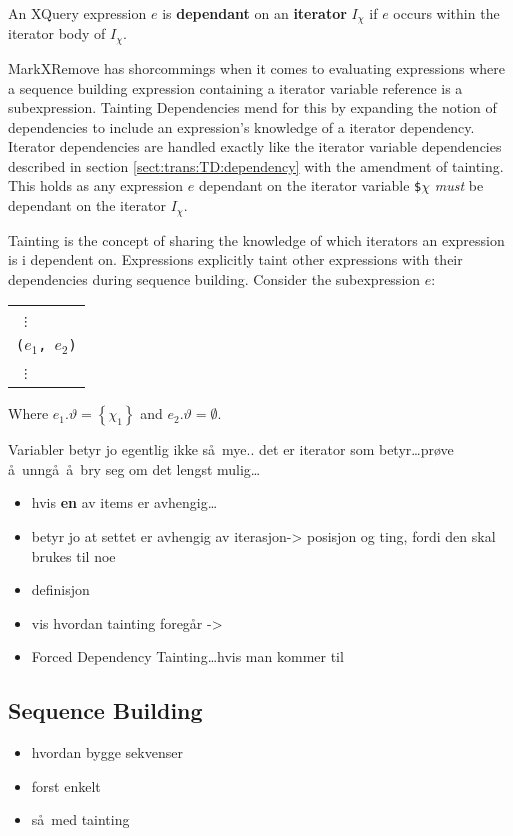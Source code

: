\noindent
\begin{myDefinition}
An XQuery expression $e$ is \textbf{dependant} on an \textbf{iterator} $I_{\chi}$ if $e$ occurs within the iterator
body of $I_{\chi}$.
\label{def:iteratorDep}
\end{myDefinition}

MarkXRemove has shorcommings when it comes to evaluating expressions where a sequence building expression
containing a iterator variable reference is a subexpression. Tainting Dependencies mend for this by expanding the
notion of dependencies to include an expression's knowledge of a iterator dependency. Iterator dependencies are
handled exactly like the iterator variable dependencies described in section \ref{sect:trans:TD:dependency} with
the amendment of tainting. This holds as any expression $e$ dependant on the iterator variable \texttt{\$}$\chi$
\textit{must} be dependant on the iterator $I_{\chi}$.

Tainting is the concept of sharing the knowledge of which iterators an expression is i dependent on. Expressions
explicitly taint other expressions with their dependencies during sequence building. Consider the subexpression
$e$:
\begin{center}
\begin{tabular}{l}
\quad \;\, $\vdots$  \\
\texttt{(}$e_{1}$\texttt{, }$e_{2}$\texttt{)}\\
\quad \;\, $\vdots$  
\end{tabular}
\end{center}
Where $e_{1}.\vartheta = \left\{\chi_{1}\right\}$ and $e_{2}.\vartheta = \emptyset$.


Variabler betyr jo egentlig ikke s\aa~mye.. det er iterator som betyr\ldots pr\o ve
\aa~unng\aa~\aa~bry seg om det lengst mulig\ldots

\begin{itemize}
  \item hvis \textbf{en} av items er avhengig\ldots
  \item betyr jo at settet er avhengig av iterasjon-> posisjon og ting, fordi den skal brukes til noe
  \item definisjon
  \item vis hvordan tainting foreg\aa r ->
  \item Forced Dependency Tainting\ldots hvis man kommer til 
\end{itemize}

\subsection{Sequence Building}
\label{sect:trans:TD:seqBuild}
\begin{itemize}
  \item hvordan bygge sekvenser
  \item forst enkelt
  \item s\aa~med tainting
\end{itemize}

